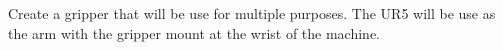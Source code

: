 Create a gripper that will be use for multiple purposes. The UR5 will be use as the arm with the gripper mount at the wrist of the machine.